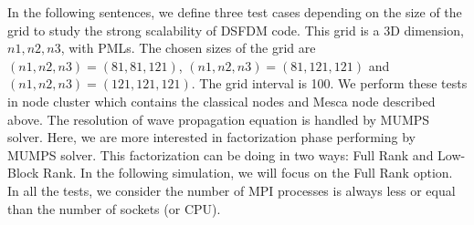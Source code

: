 In the following sentences, we define three test cases depending on the size of the grid to study the strong scalability of DSFDM code. This grid is a 3D dimension, $n1, n2, n3$, with PMLs. The chosen sizes of the grid are  $(n1,n2,n3)=(81,81,121)$,  $(n1,n2,n3)=(81,121,121)$ and $(n1,n2,n3)=(121,121,121)$. The grid interval is 100. We perform these tests in node cluster which contains the classical nodes and Mesca node described above. The resolution of wave propagation equation is handled by MUMPS solver. Here, we are more interested in factorization phase performing by MUMPS solver. This factorization can be doing in two ways: Full Rank and Low-Block Rank. In the following simulation, we will focus on the Full Rank option. In all the tests, we consider the number of MPI processes is always less or equal than the number of sockets (or CPU). 


